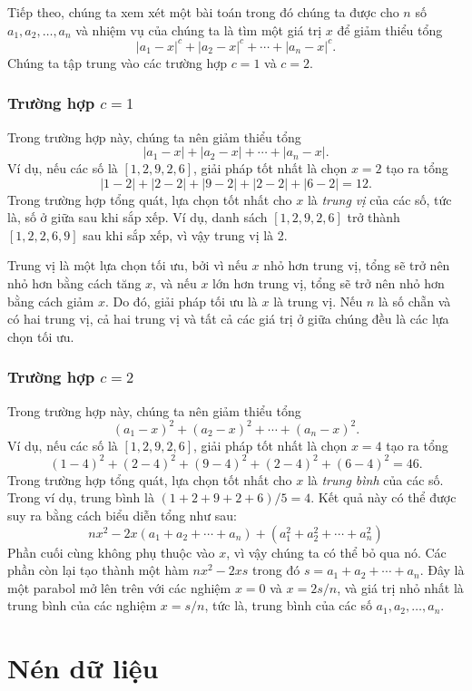 Tiếp theo, chúng ta xem xét một bài toán trong đó
chúng ta được cho $n$ số $a_1,a_2,\ldots,a_n$
và nhiệm vụ của chúng ta là tìm một giá trị $x$
để giảm thiểu tổng
\[|a_1-x|^c+|a_2-x|^c+\cdots+|a_n-x|^c.\]
Chúng ta tập trung vào các trường hợp $c=1$ và $c=2$.

\subsubsection{Trường hợp $c=1$}

Trong trường hợp này, chúng ta nên giảm thiểu tổng
\[|a_1-x|+|a_2-x|+\cdots+|a_n-x|.\]
Ví dụ, nếu các số là $[1,2,9,2,6]$,
giải pháp tốt nhất là chọn $x=2$
tạo ra tổng
\[
|1-2|+|2-2|+|9-2|+|2-2|+|6-2|=12.
\]
Trong trường hợp tổng quát, lựa chọn tốt nhất cho $x$
là \textit{trung vị} của các số,
tức là, số ở giữa sau khi sắp xếp.
Ví dụ, danh sách $[1,2,9,2,6]$
trở thành $[1,2,2,6,9]$ sau khi sắp xếp,
vì vậy trung vị là 2.

Trung vị là một lựa chọn tối ưu,
bởi vì nếu $x$ nhỏ hơn trung vị,
tổng sẽ trở nên nhỏ hơn bằng cách tăng $x$,
và nếu $x$ lớn hơn trung vị,
tổng sẽ trở nên nhỏ hơn bằng cách giảm $x$.
Do đó, giải pháp tối ưu là $x$
là trung vị.
Nếu $n$ là số chẵn và có hai trung vị,
cả hai trung vị và tất cả các giá trị ở giữa chúng
đều là các lựa chọn tối ưu.

\subsubsection{Trường hợp $c=2$}

Trong trường hợp này, chúng ta nên giảm thiểu tổng
\[(a_1-x)^2+(a_2-x)^2+\cdots+(a_n-x)^2.\]
Ví dụ, nếu các số là $[1,2,9,2,6]$,
giải pháp tốt nhất là chọn $x=4$
tạo ra tổng
\[
(1-4)^2+(2-4)^2+(9-4)^2+(2-4)^2+(6-4)^2=46.
\]
Trong trường hợp tổng quát, lựa chọn tốt nhất cho $x$
là \emph{trung bình} của các số.
Trong ví dụ, trung bình là $(1+2+9+2+6)/5=4$.
Kết quả này có thể được suy ra bằng cách biểu diễn
tổng như sau:
\[
nx^2 - 2x(a_1+a_2+\cdots+a_n) + (a_1^2+a_2^2+\cdots+a_n^2)
\]
Phần cuối cùng không phụ thuộc vào $x$,
vì vậy chúng ta có thể bỏ qua nó.
Các phần còn lại tạo thành một hàm
$nx^2-2xs$ trong đó $s=a_1+a_2+\cdots+a_n$.
Đây là một parabol mở lên trên
với các nghiệm $x=0$ và $x=2s/n$,
và giá trị nhỏ nhất là trung bình
của các nghiệm $x=s/n$, tức là,
trung bình của các số $a_1,a_2,\ldots,a_n$.

\section{Nén dữ liệu}

